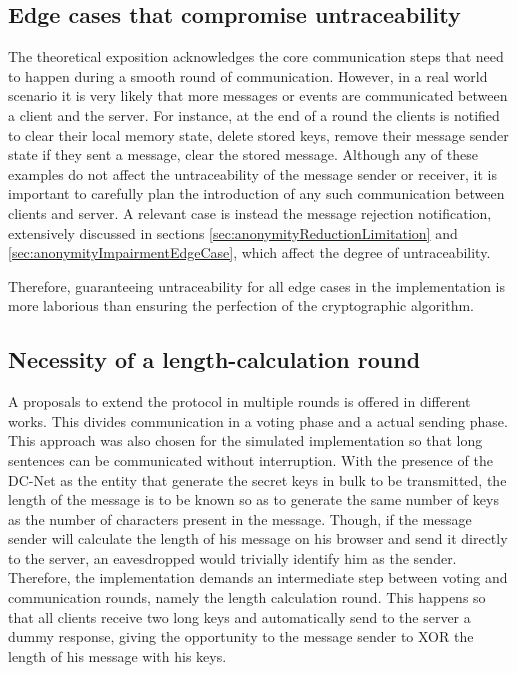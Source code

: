 \subsection{Edge cases that compromise untraceability}
The theoretical exposition acknowledges the core communication steps that need to happen during a smooth round of communication. However, in a real world scenario it is very likely that more messages or events are communicated between a client and the server. For instance, at the end of a round the clients is notified to clear their local memory state, delete stored keys, remove their message sender state if they sent a message, clear the stored message.  Although any of these examples do not affect the untraceability of the message sender or receiver, it is important to carefully plan the introduction of any such communication between clients and server. A relevant case is instead the message rejection notification, extensively discussed in sections \ref{sec:anonymityReductionLimitation} and \ref{sec:anonymityImpairmentEdgeCase}, which affect the degree of untraceability.  

Therefore, guaranteeing untraceability for all edge cases in the implementation is more laborious than ensuring the perfection of the cryptographic algorithm.


\subsection{Necessity of a length-calculation round}
A proposals to extend the protocol in multiple rounds is offered in different works. This divides communication in a voting phase and a actual sending phase. This approach was also chosen for the simulated implementation so that long sentences can be communicated without interruption. With the presence of the DC-Net as the entity that generate the secret keys in bulk to be transmitted, the length of the message is to be known so as to generate the same number of keys as the number of characters present in the message. Though, if the message sender will calculate the length of his message on his browser and send it directly to the server, an eavesdropped would trivially identify him as the sender. Therefore, the implementation demands an intermediate step between voting and communication rounds, namely the length calculation round. This happens so that all clients receive two long keys and automatically send to the server a dummy response, giving the opportunity to the message sender to XOR the length of his message with his keys.


